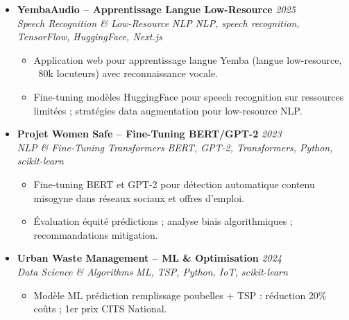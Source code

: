\documentclass[a4paper,11pt]{article}
\begin{document}
\begin{itemize}[leftmargin=*, label={-}]
    \item \textbf{YembaAudio -- Apprentissage Langue Low-Resource} \hfill \textit{2025} \\
    \textit{Speech Recognition \& Low-Resource NLP} \hfill \textit{NLP, speech recognition, TensorFlow, HuggingFace, Next.js}
    \vspace{-2pt}
    \begin{itemize}[leftmargin=0.4cm, nosep, label=\tiny$\bullet$]
        \item \small{Application web pour apprentissage langue Yemba (langue low-resource, ~80k locuteurs) avec reconnaissance vocale.}
        \item \small{Fine-tuning modèles HuggingFace pour speech recognition sur ressources limitées ; stratégies data augmentation pour low-resource NLP.}
    \end{itemize}
    \vspace{3pt}

    \item \textbf{Projet Women Safe -- Fine-Tuning BERT/GPT-2} \hfill \textit{2023} \\
    \textit{NLP \& Fine-Tuning Transformers} \hfill \textit{BERT, GPT-2, Transformers, Python, scikit-learn}
    \vspace{-2pt}
    \begin{itemize}[leftmargin=0.4cm, nosep, label=\tiny$\bullet$]
        \item \small{Fine-tuning BERT et GPT-2 pour détection automatique contenu misogyne dans réseaux sociaux et offres d'emploi.}
        \item \small{Évaluation équité prédictions ; analyse biais algorithmiques ; recommandations mitigation.}
    \end{itemize}
    \vspace{3pt}

    \item \textbf{Urban Waste Management -- ML \& Optimisation} \hfill \textit{2024} \\
    \textit{Data Science \& Algorithms} \hfill \textit{ML, TSP, Python, IoT, scikit-learn}
    \vspace{-2pt}
    \begin{itemize}[leftmargin=0.4cm, nosep, label=\tiny$\bullet$]
        \item \small{Modèle ML prédiction remplissage poubelles + TSP : réduction 20\% coûts ; 1er prix CITS National.}
    \end{itemize}
    \vspace{3pt}

\end{itemize}
\end{document}
